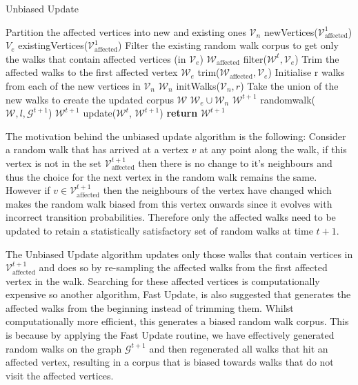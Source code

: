 \documentclass[a4paper]{article}
\renewcommand{\G}{\mathcal G}
\renewcommand{\V}{\mathcal V}
\newcommand{\W}{\mathcal W}
\begin{document}
\begin{algorithm}[!ht]
  \caption{Unbiased Update}
  \begin{algorithmic}[1]

    \Procedure{UnbiasedUpdate}{$\G^{t+1}, \W^t, \V^1_{\text{affected}}, r, l$}
    \LineComment Partition the affected vertices into new and existing ones
    \State $\V_n$ \leftarrow newVertices($\V_{\text{affected}}^1$)
    \State $V_e$ \leftarrow existingVertices($\V_{\text{affected}}^1$)
    \LineComment Filter the existing random walk corpus to get only the walks
    that contain affected vertices (in $\V_e$)
    \State $\W_{\text{affected}}$ \leftarrow filter($\W^t, \V_e$)
    \LineComment Trim the affected walks to the first affected vertex
    \State $\W_e$ \leftarrow trim($\W_{\text{affected}}, \V_e$)
    \LineComment \leftarrow Initialise r walks from each of the new vertices in $\V_n$
    \State $\W_n$ \leftarrow initWalks($\V_n, r$)
    \LineComment Take the union of the new walks to create the updated corpus
    \State $\W$ \leftarrow $\W_e \cup \W_n$
    \State $\W^{t+1}$ \leftarrow randomwalk($\W, l, \G^{t+1}$)
    \State $\W^{t+1}$ \leftarrow update($\W^t$, $\W^{t+1}$)
    \State \textbf{return} $\W^{t+1}$
    \EndProcedure
  \end{algorithmic}
\end{algorithm}
The motivation behind the unbiased update algorithm is the following: Consider a
random walk that has arrived at a vertex $v$ at any point along the walk, if
this vertex is not in the set $\V^{t+1}_{\text{affected}}$ then there is no
change to it's neighbours and thus the choice for the next vertex in the random
walk remains the same. However if $v \in \V^{t+1}_{\text{affected}}$ then the
neighbours of the vertex have changed which makes the random walk biased from
this vertex onwards since it evolves with incorrect transition probabilities. Therefore only the affected walks need to be updated to retain a statistically
satisfactory set of random walks at time $t+1$.

The Unbiased Update algorithm updates only those walks that contain vertices in
$\V^{t+1}_{\text{affected}}$ and does so by re-sampling the affected walks from
the first affected vertex in the walk. Searching for these affected vertices is computationally expensive so another algorithm,
Fast Update, is also suggested that generates the affected walks from the
beginning instead of trimming them. Whilst computationally more efficient, this
generates a biased random walk corpus. This is because by applying the Fast Update routine, we have
effectively generated random walks on the graph $\G^{t+1}$ and then regenerated
all walks that hit an affected vertex, resulting in a corpus that is biased towards walks
that do not visit the affected vertices.
\end{document}
